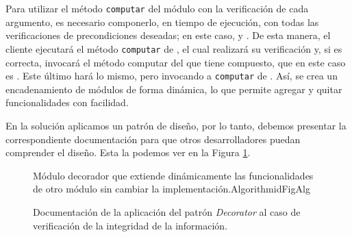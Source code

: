 Para utilizar el método \verb|computar| del módulo \MecanismoConcreto con la verificación de cada argumento, es necesario componerlo, en tiempo de ejecución, con todas las verificaciones de precondiciones deseadas; en este caso, \PrimerArgPositivo y \SegundoArgPar. De esta manera, el cliente ejecutará el método \verb|computar| de \PrimerArgPositivo, el cual realizará su verificación y, si es correcta, invocará el método computar del \Mecanismo que tiene compuesto, que en este caso es \SegundoArgPar. Este último hará lo mismo, pero invocando a \verb|computar| de \MecanismoConcreto. Así, se crea un encadenamiento de módulos de forma dinámica, lo que permite agregar y quitar funcionalidades con facilidad.

En la solución aplicamos un patrón de diseño, por lo tanto, debemos presentar la correspondiente documentación para que otros desarrolladores puedan comprender el diseño. Esta la podemos ver en la Figura \ref{docDecorator}.

\begin{figure}[H]
\caption{Documentación de la aplicación del patrón \textit{Decorator} al caso de verificación de la integridad de la información.}
\label{docDecorator}
\begin{pattern}[]{Módulo decorador que extiende dinámicamente las funcionalidades de otro módulo sin cambiar la implementación.}{Algorithm}{idFigAlg}
\assigns
{}

\end{pattern}
\end{figure}

